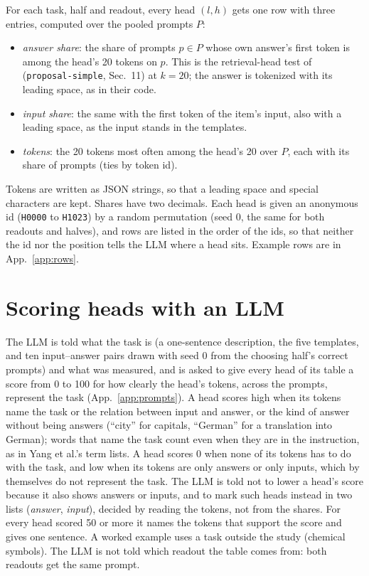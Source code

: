 \documentclass[11pt,a4paper]{article}
\newcommand{\simple}[1]{\texttt{proposal-simple}, #1}
\begin{document}
For each task, half and readout, every head $(l,h)$ gets one row with three entries, computed over the pooled prompts $P$:
\begin{itemize}
  \item \emph{answer share}: the share of prompts $p\in P$ whose own answer's first token is among the head's 20 tokens on $p$. This is the retrieval-head test of \citet{yang2026shared} (\simple{Sec.~11}) at $k = 20$; the answer is tokenized with its leading space, as in their code.
  \item \emph{input share}: the same with the first token of the item's input, also with a leading space, as the input stands in the templates.
  \item \emph{tokens}: the 20 tokens most often among the head's 20 over $P$, each with its share of prompts (ties by token id).
\end{itemize}
Tokens are written as JSON strings, so that a leading space and special characters are kept. Shares have two decimals. Each head is given an anonymous id (\texttt{H0000} to \texttt{H1023}) by a random permutation (seed 0, the same for both readouts and halves), and rows are listed in the order of the ids, so that neither the id nor the position tells the LLM where a head sits. Example rows are in App.~\ref{app:rows}.

\section{Scoring heads with an LLM}\label{sec:llm}

The LLM is told what the task is (a one-sentence description, the five templates, and ten input--answer pairs drawn with seed 0 from the choosing half's correct prompts) and what was measured, and is asked to give every head of its table a score from 0 to 100 for how clearly the head's tokens, across the prompts, represent the task (App.~\ref{app:prompts}). A head scores high when its tokens name the task or the relation between input and answer, or the kind of answer without being answers (``city'' for capitals, ``German'' for a translation into German); words that name the task count even when they are in the instruction, as in Yang et al.'s term lists. A head scores 0 when none of its tokens has to do with the task, and low when its tokens are only answers or only inputs, which by themselves do not represent the task. The LLM is told not to lower a head's score because it also shows answers or inputs, and to mark such heads instead in two lists (\emph{answer}, \emph{input}), decided by reading the tokens, not from the shares. For every head scored 50 or more it names the tokens that support the score and gives one sentence. A worked example uses a task outside the study (chemical symbols). The LLM is not told which readout the table comes from: both readouts get the same prompt.
\end{document}
